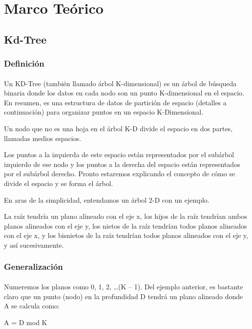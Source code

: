 \documentclass{article}
\begin{document}
\section{Marco Teórico}
\subsection{Kd-Tree}

\subsubsection{Definición}
\paragraph{}
Un KD-Tree (también llamado árbol K-dimensional) es un árbol de búsqueda binaria donde los datos en cada nodo son un punto K-dimensional en el espacio. En resumen, es una estructura de datos de partición de espacio (detalles a continuación) para organizar puntos en un espacio K-Dimensional.

Un nodo que no es una hoja en el árbol K-D divide el espacio en dos partes, llamadas medios espacios.

Los puntos a la izquierda de este espacio están representados por el subárbol izquierdo de ese nodo y los puntos a la derecha del espacio están representados por el subárbol derecho. Pronto estaremos explicando el concepto de cómo se divide el espacio y se forma el árbol.

En aras de la simplicidad, entendamos un árbol 2-D con un ejemplo.

La raíz tendría un plano alineado con el eje x, los hijos de la raíz tendrían ambos planos alineados con el eje y, los nietos de la raíz tendrían todos planos alineados con el eje x, y los bisnietos de la raíz tendrían todos planos alineados con el eje y, y así sucesivamente.

\subsubsection{Generalización}
\paragraph{}
Numeremos los planos como 0, 1, 2, …(K – 1). Del ejemplo anterior, es bastante claro que un punto (nodo) en la profundidad D tendrá un plano alineado donde A se calcula como:

A = D mod K
\end{document}
